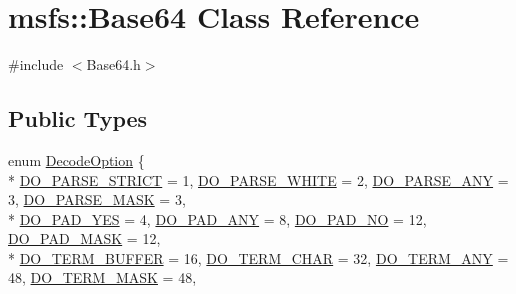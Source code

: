 \hypertarget{classmsfs_1_1_base64}{}\section{msfs\+:\+:Base64 Class Reference}
\label{classmsfs_1_1_base64}


{\ttfamily \#include $<$Base64.\+h$>$}

\subsection*{Public Types}
\begin{DoxyCompactItemize}
\item 
enum \hyperlink{classmsfs_1_1_base64_aca79ad65b25bf05b3e953ddd844cef2f}{Decode\+Option} \{ \\*
\hyperlink{classmsfs_1_1_base64_aca79ad65b25bf05b3e953ddd844cef2fa8a8f933ef15602d734f6d4ff9a47ede6}{D\+O\+\_\+\+P\+A\+R\+S\+E\+\_\+\+S\+T\+R\+I\+C\+T} = 1, 
\hyperlink{classmsfs_1_1_base64_aca79ad65b25bf05b3e953ddd844cef2fa356be1c7bf0b250cba677f671144b7d8}{D\+O\+\_\+\+P\+A\+R\+S\+E\+\_\+\+W\+H\+I\+T\+E} = 2, 
\hyperlink{classmsfs_1_1_base64_aca79ad65b25bf05b3e953ddd844cef2faae48b9be0341b427bc339fa833f6d04b}{D\+O\+\_\+\+P\+A\+R\+S\+E\+\_\+\+A\+N\+Y} = 3, 
\hyperlink{classmsfs_1_1_base64_aca79ad65b25bf05b3e953ddd844cef2fafc9f955f6daab916249d3a82912879af}{D\+O\+\_\+\+P\+A\+R\+S\+E\+\_\+\+M\+A\+S\+K} = 3, 
\\*
\hyperlink{classmsfs_1_1_base64_aca79ad65b25bf05b3e953ddd844cef2fad4dacb890dd1f416e3df93af74a368fc}{D\+O\+\_\+\+P\+A\+D\+\_\+\+Y\+E\+S} = 4, 
\hyperlink{classmsfs_1_1_base64_aca79ad65b25bf05b3e953ddd844cef2faca8a3e162a5017cfa764cc3ccf36507f}{D\+O\+\_\+\+P\+A\+D\+\_\+\+A\+N\+Y} = 8, 
\hyperlink{classmsfs_1_1_base64_aca79ad65b25bf05b3e953ddd844cef2fa44a5f46bdfd919dfb5f1450ed721baa0}{D\+O\+\_\+\+P\+A\+D\+\_\+\+N\+O} = 12, 
\hyperlink{classmsfs_1_1_base64_aca79ad65b25bf05b3e953ddd844cef2fac9c911e29a36c38dcbf963048b220950}{D\+O\+\_\+\+P\+A\+D\+\_\+\+M\+A\+S\+K} = 12, 
\\*
\hyperlink{classmsfs_1_1_base64_aca79ad65b25bf05b3e953ddd844cef2fa510b1305a217b89116d60fe51eb647ea}{D\+O\+\_\+\+T\+E\+R\+M\+\_\+\+B\+U\+F\+F\+E\+R} = 16, 
\hyperlink{classmsfs_1_1_base64_aca79ad65b25bf05b3e953ddd844cef2faa0b9f3aa941a185e9cd18d3c38af7148}{D\+O\+\_\+\+T\+E\+R\+M\+\_\+\+C\+H\+A\+R} = 32, 
\hyperlink{classmsfs_1_1_base64_aca79ad65b25bf05b3e953ddd844cef2fa59eca5a3cf8f958c3bc622e91dac093f}{D\+O\+\_\+\+T\+E\+R\+M\+\_\+\+A\+N\+Y} = 48, 
\hyperlink{classmsfs_1_1_base64_aca79ad65b25bf05b3e953ddd844cef2fa191ba19c2d34b8717e4df3d0c446a98e}{D\+O\+\_\+\+T\+E\+R\+M\+\_\+\+M\+A\+S\+K} = 48, 

\end{DoxyCompactItemize}
